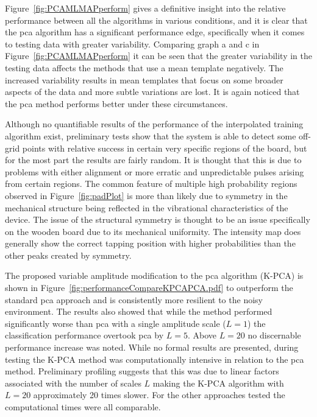 Figure~\ref{fig:PCAMLMAPperform} gives a definitive insight into the relative performance between all the algorithms in various conditions, and it is clear that the \gls{pca} algorithm has a significant performance edge, specifically when it comes to testing data with greater variability. Comparing graph a and c in Figure~\ref{fig:PCAMLMAPperform} it can be seen that the greater variability in the testing data affects the methods that use a mean template negatively. The increased variability results in mean templates that focus on some broader aspects of the data and more subtle variations are lost. It is again noticed that the \gls{pca} method performs better under these circumstances.

Although no quantifiable results of the performance of the interpolated training algorithm exist, preliminary tests show that the system is able to detect some off- grid points with relative success in certain very specific regions of the board, but for the most part the results are fairly random. It is thought that this is due to problems with either alignment or more erratic and unpredictable pulses arising from certain regions. The common feature of multiple high probability regions observed in Figure~\ref{fig:padPlot} is more than likely due to symmetry in the mechanical structure being reflected in the vibrational characteristics of the device. The issue of the structural symmetry is thought to be an issue specifically on the wooden board due to its mechanical uniformity. The intensity map does generally show the correct tapping position with higher probabilities than the other peaks created by symmetry.

The proposed variable amplitude modification to the \gls{pca} algorithm (K-PCA) is shown in Figure~\ref{fig:performanceCompareKPCAPCA.pdf} to outperform the standard \gls{pca} approach and is consistently more resilient to the noisy environment. The results also showed that while the method performed significantly worse than \gls{pca} with a single amplitude scale ($L=1$) the classification performance overtook \gls{pca} by $L=5$. Above $L=20$ no discernable performance increase was noted. While no formal results are presented, during testing the K-PCA method was computationally intensive in relation to the \gls{pca} method. Preliminary profiling suggests that this was due to linear factors associated with the number of scales $L$ making the K-PCA algorithm with $L=20$ approximately 20 times slower. For the other approaches tested the computational times were all comparable.


